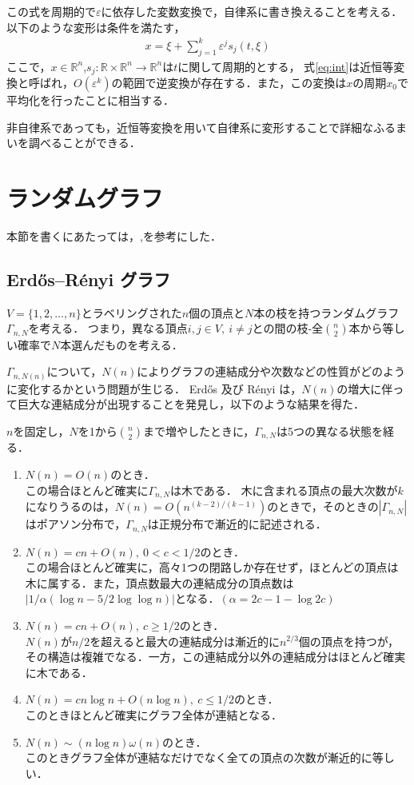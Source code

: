 \documentclass[../main]{subfiles}
\begin{document}
この式を周期的で$\varepsilon$に依存した変数変換で，自律系に書き換えることを考える．
以下のような変形は条件を満たす，
\begin{align}
    \label{eq:int}
    x=\xi+\sum_{j=1}^k \varepsilon^j s_j(t,\xi)
\end{align}
ここで，$x\in\mathbb{R}^n$,$s_j:\mathbb{R}\times\mathbb{R}^n\to\mathbb{R}^n$は$t$に関して周期的とする，
式\eqref{eq:int}は近恒等変換と呼ばれ，$O(\varepsilon^k)$の範囲で逆変換が存在する．また，この変換は$x$の周期$x_0$で平均化を行ったことに相当する．

非自律系であっても，近恒等変換を用いて自律系に変形することで詳細なふるまいを調べることができる．
\section{ランダムグラフ}
本節を書くにあたっては，\cite{Bollobas2013},\cite{Albert2002}を参考にした．
\subsection{Erdős–Rényi グラフ}
$V=\{1,2,\ldots,n\}$とラベリングされた$n$個の頂点と$N$本の枝を持つランダムグラフ$\Gamma_{n,N}$を考える．
つまり，異なる頂点$i,j\in V,\ i\neq j$との間の枝-全$\binom{n}{2}$本から等しい確率で$N$本選んだものを考える．

$\Gamma_{n,N(n)}$について，$N(n)$によりグラフの連結成分や次数などの性質がどのように変化するかという問題が生じる．
Erdős 及び Rényi は，$N(n)$の増大に伴って巨大な連結成分が出現することを発見し，以下のような結果を得た．

$n$を固定し，$N$を1から$\binom{n}{2}$まで増やしたときに，$\Gamma_{n,N}$は5つの異なる状態を経る．\\
\renewcommand{\labelenumi}{Phase \theenumi}
\begin{enumerate}
    \item 
    $N(n)=O(n)$のとき．\\
    この場合ほとんど確実に$\Gamma_{n,N}$は木である．
    木に含まれる頂点の最大次数が$k$になりうるのは，$N(n)=O(n^{(k-2)/(k-1)})$のときで，そのときの$|\Gamma_{n,N}|$はポアソン分布で，$\Gamma_{n,N}$は正規分布で漸近的に記述される．
    \item
    $N(n)=cn+O(n),\ 0<c<1/2$のとき．\\
    この場合ほとんど確実に，高々1つの閉路しか存在せず，ほとんどの頂点は木に属する．また，頂点数最大の連結成分の頂点数は$|1/\alpha(\log n-5/2\log\log n)|$となる．$(\alpha=2c-1-\log 2c)$
    \item
    $N(n)=cn+O(n),\ c\geq 1/2$のとき．\\
    $N(n)$が$n/2$を超えると最大の連結成分は漸近的に$n^{2/3}$個の頂点を持つが，その構造は複雑でなる．一方，この連結成分以外の連結成分はほとんど確実に木である．
    \item
    $N(n)=cn\log n+O(n\log n),\ c\leq 1/2$のとき．\\
    このときほとんど確実にグラフ全体が連結となる．
    \item
    $N(n)\sim(n\log n)\omega(n)$のとき．\\
    このときグラフ全体が連結なだけでなく全ての頂点の次数が漸近的に等しい．
\end{enumerate}
\renewcommand{\labelenumi}{\theenumi}
\end{document}
